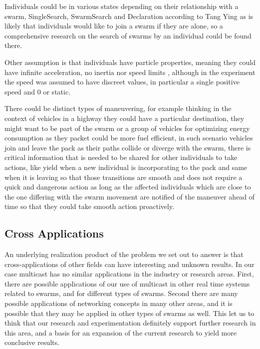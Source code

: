 \documentclass[journal]{IEEEtran}
\begin{document}
Individuals could be in various states depending on their relationship with a swarm, SingleSearch, SwarmSearch and Declaration according to Tang Ying \cite{HH4} as is likely that individuals would like to join a swarm if they are alone, so a comprehensive research on the search of swarms by an individual could be found there.

Other assumption is that individuals have particle properties, meaning they could have infinite acceleration, no inertia nor speed limits \cite{HH4}, although in the experiment the speed was assumed to have discreet values, in particular a single positive speed and 0 or static.

There could be distinct types of maneuvering, for example thinking in the context of vehicles in a highway they could have a particular destination, they might want to be part of the swarm or a group of vehicles for optimizing energy consumption as they packet could be more fuel efficient, in such scenario vehicles join and leave the pack as their paths collide or diverge with the swarm, there is critical information that is needed to be shared for other individuals to take actions, like yield when a new individual is incorporating to the pack and same when it is leaving so that those transitions are smooth and does not require a quick and dangerous action as long as the affected individuals which are close to the one differing with the swarm movement are notified of the maneuver ahead of time so that they could take smooth action proactively.

\subsection{Cross Applications}
An underlying realization product of the problem we set out to answer is that cross-applications of other fields can have interesting and unknown results. In our case multicast has no similar applications in the industry or research areas. First, there are possible applications of our use of multicast in other real time systems related to swarms, and for different types of swarms. Second there are many possible applications of networking concepts in many other areas, and it is possible that they may be applied in other types of swarms as well. 
This let us to think that our research and experimentation definitely support further research in this area, and a basis for an expansion of the current research to yield more conclusive results. 
\end{document}
